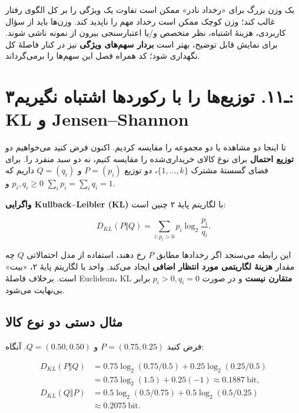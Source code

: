 \documentclass[12pt,a4paper,oneside]{book}
\begin{document}
یک وزن بزرگ برای «رخداد نادر» ممکن است تفاوت یک ویژگی را بر کل الگوی رفتار غالب کند؛ وزن کوچک ممکن است رخداد مهم را ناپدید کند. وزن‌ها باید از سؤال کاربردی، هزینهٔ اشتباه، نظر متخصص و/یا اعتبارسنجی بیرون از نمونه ناشی شوند. برای نمایش قابل توضیح، بهتر است \textbf{بردار سهم‌های ویژگی} نیز در کنار فاصلهٔ کل نگهداری شود؛ کد همراه فصل این سهم‌ها را برمی‌گرداند.

\section{۳ـ۱۱. توزیع‌ها را با رکوردها اشتباه نگیریم: KL و Jensen--Shannon}\label{ux640ux6f1ux6f1.-ux62aux648ux632ux6ccux639ux647ux627-ux631ux627-ux628ux627-ux631ux6a9ux648ux631ux62fux647ux627-ux627ux634ux62aux628ux627ux647-ux646ux6afux6ccux631ux6ccux645-kl-ux648-jensenshannon}

تا اینجا دو مشاهده یا دو مجموعه را مقایسه کردیم. اکنون فرض کنید می‌خواهیم دو \textbf{توزیع احتمال} برای نوع کالای خریداری‌شده را مقایسه کنیم، نه دو سبد منفرد را. برای فضای گسستهٔ مشترک \(\{1,\ldots,k\}\)، دو توزیع \(P=(p_i)\) و \(Q=(q_i)\) داریم که \(p_i,q_i\ge0\) و \(\sum_i p_i=\sum_i q_i=1\).

\textbf{واگرایی Kullback--Leibler (KL)} با لگاریتم پایهٔ ۲ چنین است:

\[
D_{KL}(P\Vert Q)=\sum_{i:p_i>0}p_i\log_2\frac{p_i}{q_i}.
\]

این رابطه می‌سنجد اگر رخدادها مطابق \(P\) رخ دهند، استفاده از مدل احتمالاتی \(Q\) چه مقدار \textbf{هزینهٔ لگاریتمی مورد انتظار اضافی} ایجاد می‌کند. واحد با لگاریتم پایهٔ ۲، «بیت» است. برخلاف فاصلهٔ Euclidean، KL \textbf{متقارن نیست} و در صورت \(p_i>0,q_i=0\) برابر بی‌نهایت می‌شود.

\subsection{مثال دستی دو نوع کالا}\label{ux645ux62bux627ux644-ux62fux633ux62aux6cc-ux62fux648-ux646ux648ux639-ux6a9ux627ux644ux627}

فرض کنید \(P=(0.75,0.25)\) و \(Q=(0.50,0.50)\). آنگاه:

\[
\begin{aligned}
D_{KL}(P\Vert Q)
&=0.75\log_2(0.75/0.5)+0.25\log_2(0.25/0.5)\\
&=0.75\log_2(1.5)+0.25(-1)\approx0.1887\ \text{bit},\\
D_{KL}(Q\Vert P)
&=0.5\log_2(0.5/0.75)+0.5\log_2(0.5/0.25)\\
&\approx0.2075\ \text{bit}.
\end{aligned}
\]
\end{document}
